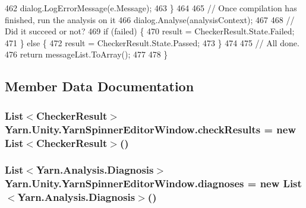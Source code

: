 \begin{DoxyCode}
462                 dialog.LogErrorMessage(e.Message);
463             \}
464 
465             \textcolor{comment}{// Once compilation has finished, run the analysis on it}
466             dialog.Analyse(analysisContext);
467 
468             \textcolor{comment}{// Did it succeed or not?}
469             \textcolor{keywordflow}{if} (failed) \{
470                 result = CheckerResult.State.Failed;
471             \} \textcolor{keywordflow}{else} \{
472                 result = CheckerResult.State.Passed;
473             \}
474 
475             \textcolor{comment}{// All done.}
476             \textcolor{keywordflow}{return} messageList.ToArray();
477 
478         \}
\end{DoxyCode}


\subsection{Member Data Documentation}
\hypertarget{a00162_aa85ab7bd194e5425b991b9c216d4d10e}{
\subsubsection[{check\-Results}]{\setlength{\rightskip}{0pt plus 5cm}List$<${\bf Checker\-Result}$>$ Yarn.\-Unity.\-Yarn\-Spinner\-Editor\-Window.\-check\-Results = new List$<${\bf Checker\-Result}$>$()\hspace{0.3cm}{\ttfamily [private]}}}\label{a00162_aa85ab7bd194e5425b991b9c216d4d10e}
\hypertarget{a00162_a25c92cbfdd09661a96714d05b14af886}{
\subsubsection[{diagnoses}]{\setlength{\rightskip}{0pt plus 5cm}List$<${\bf Yarn.\-Analysis.\-Diagnosis}$>$ Yarn.\-Unity.\-Yarn\-Spinner\-Editor\-Window.\-diagnoses = new List$<${\bf Yarn.\-Analysis.\-Diagnosis}$>$()\hspace{0.3cm}{\ttfamily [private]}}}\label{a00162_a25c92cbfdd09661a96714d05b14af886}
